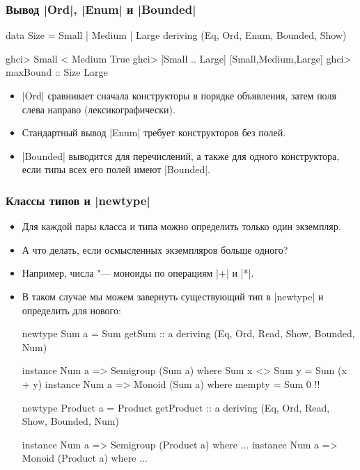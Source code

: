 \documentclass[10pt]{beamer}
\begin{document}
\begin{frame}[fragile]
  \frametitle{Вывод \haskinline|Ord|, \haskinline|Enum| и \haskinline|Bounded|}
  \begin{haskell}
    data Size = Small | Medium | Large
        deriving (Eq, Ord, Enum, Bounded, Show)

    ghci> Small < Medium
    True
    ghci> [Small .. Large]
    [Small,Medium,Large]
    ghci> maxBound :: Size
    Large
  \end{haskell}
  \begin{itemize}
    \item \haskinline|Ord| сравнивает сначала конструкторы в порядке объявления, затем поля слева направо (лексикографически).
    \item Стандартный вывод \haskinline|Enum| требует конструкторов без полей.
    \item \haskinline|Bounded| выводится для перечислений, а также для одного конструктора, если типы всех его полей имеют \haskinline|Bounded|.
  \end{itemize}
\end{frame}
\begin{frame}[fragile]
  \frametitle{Классы типов и \haskinline|newtype|}
  \begin{itemize}
    \item Для каждой пары класса и типа можно определить только один экземпляр.
    \item А что делать, если осмысленных экземпляров больше одного?
    \item Например, числа "--- моноиды по операциям \haskinline|+| и \haskinline|*|.\pause
    \item В таком случае мы можем завернуть существующий тип в \haskinline|newtype| и определить для нового:
          \begin{haskelltiny}
            newtype Sum a = Sum { getSum :: a }
                deriving (Eq, Ord, Read, Show, Bounded, Num)

            instance Num a => Semigroup (Sum a) where
                Sum x <> Sum y = Sum (x + y)
            instance Num a => Monoid (Sum a) where
                mempty = Sum 0 !\pause!

            newtype Product a = Product { getProduct :: a }
                deriving (Eq, Ord, Read, Show, Bounded, Num)

            instance Num a => Semigroup (Product a) where ...
            instance Num a => Monoid (Product a) where ...
          \end{haskelltiny}
  \end{itemize}
\end{frame}
\end{document}
